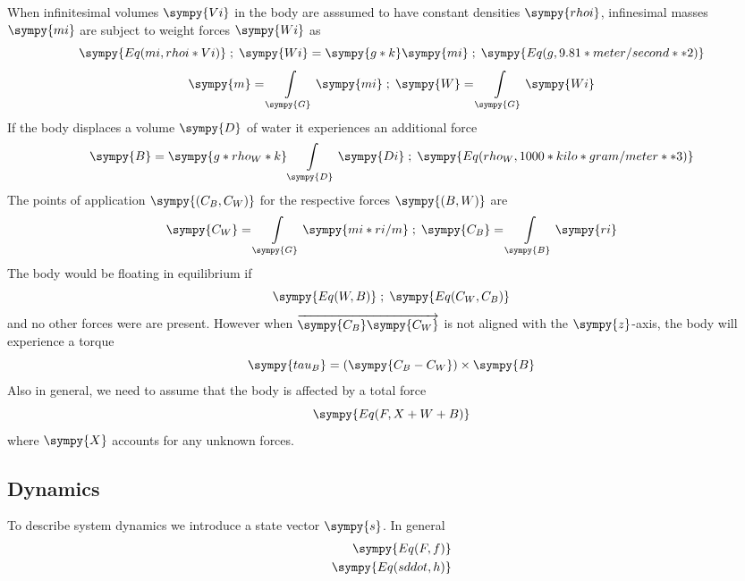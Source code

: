 \documentclass[12pt,a4paper]{article}
\newcommand{\s}{\sympy}
\begin{document}
When infinitesimal volumes $\s{Vi}$ in the body are asssumed to have constant densities $\s{rhoi}$, infinesimal masses $\s{mi}$ are subject to weight forces $\s{Wi}$ as
\begin{equation*}
\s{Eq(mi, rhoi * Vi)} \;;\; \s{Wi} =  \s{g * k} \s{mi} \;;\; \s{Eq(g, 9.81 * meter/second**2)}
\end{equation*}
\begin{equation}
\s{m} = \int\limits_{\s{G}} \s{mi} \;;\; \s{W} = \int\limits_{\s{G}} \s{Wi}
\label{eq:maw}
\end{equation}
If the body displaces a volume $\s{D}$ of water it experiences an additional force
$$\s{B} = \s{g * rho_W *  k}\int\limits_{\s{D}} \s{Di} \;;\; \s{Eq(rho_W, 1000 * kilo * gram/meter**3)}$$
The points of application $\s{(C_B, C_W)}$ for the respective forces $\s{(B, W)}$ are
\begin{equation}
	\s{C_W} = \int\limits_{\s{G}} \s{mi * ri / m} \;;\; \s{C_B} = \int\limits_{\s{B}} \s{ri} 
\label{eq:poa}
\end{equation}
The body would be floating in equilibrium if
$$\s{Eq(W, B)} \;;\; \s{Eq(C_W, C_B)}$$
and no other forces were are present.  
However when $\overrightarrow{\s{C_B} \s{C_W}}$ is not aligned with the $\s{z}$-axis, the body will experience a torque 
$$\s{tau_B} = (\s{C_B-C_W}) \times \s{B}$$
Also in general, we need to assume that the body is affected by a total force
\begin{equation*}
\s{Eq(F, X + W + B)}
\end{equation*}
where $\s{X}$ accounts for any unknown forces.
\subsection{Dynamics}
To describe system dynamics we introduce a state vector $\s{s}$.
In general
\begin{equation}
	\begin{split}
		\s{Eq(F, f)} \\
		\s{Eq(sddot, h)} \\
\end{split}
	\label{eq:eom}
\end{equation}
\end{document}
